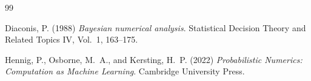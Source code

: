 \documentclass{scrartcl}
\begin{document}
\begin{thebibliography}{99}

Diaconis, P. (1988)
\textit{Bayesian numerical analysis}.
Statistical Decision Theory and Related Topics IV, Vol.~1, 163--175.


  


Hennig, P., Osborne, M.~A., and Kersting, H.~P. (2022)
\textit{Probabilistic Numerics: Computation as Machine Learning}.
Cambridge University Press.

  
 






\end{thebibliography}
\end{document}
